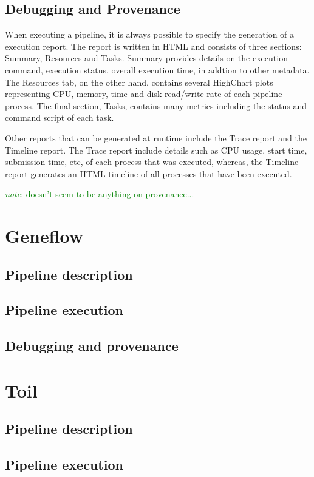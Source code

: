 \documentclass{report}
\newcommand{\note}[1]{\textcolor{green}{\textit{note}: #1}}
\begin{document}
        \subsection{Debugging and Provenance}
        When executing a pipeline, it is always possible to specify the
generation of a execution report. The report is written in HTML and consists of three sections:
Summary, Resources and Tasks. Summary provides details on the execution command,
execution status, overall execution time, in addtion to other metadata. The
Resources tab, on the other hand, contains several HighChart plots representing
CPU, memory, time and disk read/write rate of each pipeline process. The final
section, Tasks, contains many metrics including the status and command script of
each task. 

    Other reports that can be generated at runtime include the Trace report and
the Timeline report. The Trace report include details such as CPU usage, start
time, submission time, etc, of each process that was executed, whereas, the
Timeline report generates an HTML timeline of all processes that have been
executed.        

    \note{doesn't seem to be anything on provenance...}

    \section{Geneflow}
        \subsection{Pipeline description}
        \subsection{Pipeline execution}
        \subsection{Debugging and provenance}
    \section{Toil}
        \subsection{Pipeline description}
        \subsection{Pipeline execution}
\end{document}
